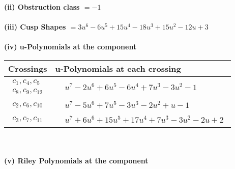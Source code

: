\documentclass[1p]{elsarticle_modified}
\theoremstyle{definition}
\begin{document}
\flushleft \textbf{(ii) Obstruction class $= -1$}\\~\\
\flushleft \textbf{(iii) Cusp Shapes $= 3 u^6-6 u^5+15 u^4-18 u^3+15 u^2-12 u+3$}\\~\\
\newpage\renewcommand{\arraystretch}{1}
\flushleft \textbf{(iv) u-Polynomials at the component}\newline \\
\begin{tabular}{m{50pt}|m{274pt}}
Crossings & \hspace{64pt}u-Polynomials at each crossing \\
\hline $$\begin{aligned}c_{1},c_{4},c_{5}\\c_{8},c_{9},c_{12}\end{aligned}$$&$\begin{aligned}
&u^7-2 u^6+6 u^5-6 u^4+7 u^3-3 u^2-1
\end{aligned}$\\
\hline $$\begin{aligned}c_{2},c_{6},c_{10}\end{aligned}$$&$\begin{aligned}
&u^7-5 u^6+7 u^5-3 u^3-2 u^2+u-1
\end{aligned}$\\
\hline $$\begin{aligned}c_{3},c_{7},c_{11}\end{aligned}$$&$\begin{aligned}
&u^7+6 u^6+15 u^5+17 u^4+7 u^3-3 u^2-2 u+2
\end{aligned}$\\
\hline
\end{tabular}\\~\\
\newpage\renewcommand{\arraystretch}{1}
\flushleft \textbf{(v) Riley Polynomials at the component}\newline \\
\end{document}
